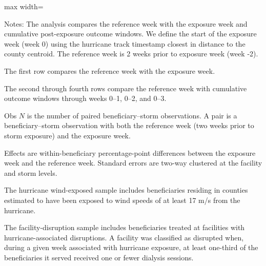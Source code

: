 \documentclass[11pt]{article}
\begin{document}
\begin{table}[!htbp]
\begin{adjustbox}{max width=\textwidth}
\begin{threeparttable}
\begin{tablenotes}[flushleft]
\footnotesize
Notes: The analysis compares the reference week with the exposure week and cumulative post-exposure outcome windows. We define the start of the exposure week (week 0) using the hurricane track timestamp closest in distance to the county centroid. The reference week is 2 weeks prior to exposure week (week -2).
\item The first row compares the reference week with the exposure week.
\item The second through fourth rows compare the reference week with cumulative outcome windows through weeks 0--1, 0--2, and 0--3.
\item[a] Obs $N$ is the number of paired beneficiary--storm observations. A pair is a beneficiary--storm observation with both the reference week (two weeks prior to storm exposure) and the exposure week.
\item[b] Effects are within-beneficiary percentage-point differences between the exposure week and the reference week. Standard errors are two-way clustered at the facility and storm levels.
\item[c] The hurricane wind-exposed sample includes beneficiaries residing in counties estimated to have been exposed to wind speeds of at least 17 m/s from the hurricane.
\item[d] The facility-disruption sample includes beneficiaries treated at facilities with hurricane-associated disruptions. A facility was classified as disrupted when, during a given week associated with hurricane exposure, at least one-third of the beneficiaries it served received one or fewer dialysis sessions.
\end{tablenotes}

\end{threeparttable}
\end{adjustbox}

\end{table}
\end{document}
